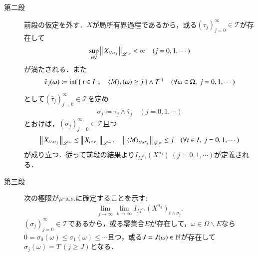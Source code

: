 \begin{prf}
\begin{description}
			\item[第二段]
				前段の仮定を外す．$X$が局所有界過程であるから，或る$(\tau_j)_{j=0}^{\infty} \in \mathcal{T}$が存在して
				\begin{align}
					\operatorname*{sup}_{t \in I} \left\|\, X_{t \wedge \tau_j}\, \right\|_{\mathscr{L}^\infty} < \infty
					\quad (j=0,1,\cdots)
				\end{align}
				が満たされる．また
				\begin{align}
					\hat{\tau}_j(\omega) \coloneqq
					\inf{}{\Set{t \in I}{\inprod<M>_t(\omega) \geq j}} \wedge T\ \footnotemark
					\quad (\forall \omega \in \Omega,\ j=0,1,\cdots)
				\end{align}
				として$\left( \hat{\tau}_j \right)_{j=0}^{\infty} \in \mathcal{T}$を定め
				\begin{align}
					\sigma_j \coloneqq \tau_j \wedge \hat{\tau}_j
					\quad (j=0,1,\cdots)
				\end{align}
				とおけば，$(\sigma_j)_{j=0}^{\infty} \in \mathcal{T}$且つ
				\begin{align}
					\Norm{X_{t \wedge \sigma_j}}{\mathscr{L}^\infty} \leq \Norm{X_{t \wedge \tau_j}}{\mathscr{L}^\infty},
					\quad \Norm{\inprod<M>_{t \wedge \sigma_j}}{\mathscr{L}^\infty} \leq j
					\quad (\forall t \in I,\ j=0,1,\cdots)
				\end{align}
				が成り立つ．従って前段の結果より$I_{M^{\sigma_j}}(X^{\sigma_j})\ (j=0,1,\cdots)$が定義される．
				
			\item[第三段]
				次の極限が$\mu$-a.s.に確定することを示す:
				\begin{align}
					\lim_{j \to \infty} \lim_{k \to \infty} I_{M^{\sigma_k}}(X^{\sigma_k})_{t \wedge \sigma_j}.
				\end{align}
				$(\sigma_j)_{j=0}^{\infty} \in \mathcal{T}$であるから，或る零集合$E$が存在して，$\omega \in \Omega \backslash E$なら
				$0 = \sigma_0(\omega) \leq \sigma_1(\omega) \leq \cdots$且つ，或る$J = J(\omega) \in \mathbb{N}$が存在して
				$\sigma_j(\omega) = T\ (j \geq J)$となる．
		\end{description}
		\QED
	\end{prf}
	